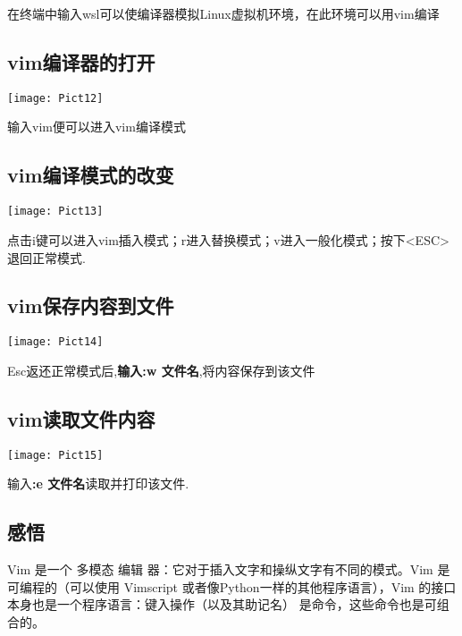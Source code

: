 \documentclass[a4paper, 12pt]{article}
\begin{document}
在终端中输入wsl可以使编译器模拟Linux虚拟机环境，在此环境可以用vim编译
\subsection{\small vim编译器的打开}
\texttt{[image: Pict12]}

输入vim便可以进入vim编译模式
\subsection{\small vim编译模式的改变}
\texttt{[image: Pict13]}

点击i键可以进入vim插入模式；r进入替换模式；v进入一般化模式；按下<ESC>退回正常模式.
\subsection{\small vim保存内容到文件}
\texttt{[image: Pict14]}

Esc返还正常模式后,\textbf{输入:w 文件名},将内容保存到该文件
\subsection{\small vim读取文件内容}
\texttt{[image: Pict15]}

输入\textbf{:e 文件名}读取并打印该文件.
\subsection{\small 感悟}
Vim 是一个 多模态 编辑 器：它对于插入文字和操纵文字有不同的模式。Vim 是可编程的（可以使用 Vimscript 或者像Python一样的其他程序语言），Vim 的接口本身也是一个程序语言：键入操作（以及其助记名） 是命令，这些命令也是可组合的。
\end{document}
